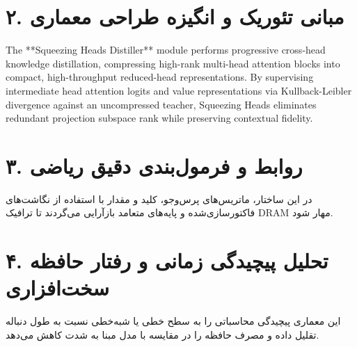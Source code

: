 \documentclass[12pt,a4paper]{article}
\begin{document}
\section*{۲. مبانی تئوریک و انگیزه طراحی معماری}
The **Squeezing Heads Distiller** module performs progressive cross-head knowledge distillation, compressing high-rank multi-head attention blocks into compact, high-throughput reduced-head representations. By supervising intermediate head attention logits and value representations via Kullback-Leibler divergence against an uncompressed teacher, Squeezing Heads eliminates redundant projection subspace rank while preserving contextual fidelity.

\section*{۳. روابط و فرمول‌بندی دقیق ریاضی}
در این ساختار، ماتریس‌های پرس‌وجو، کلید و مقدار با استفاده از نگاشت‌های فاکتورسازی‌شده و پایه‌های متعامد بازآرایی می‌گردند تا ترافیک DRAM مهار شود.

\section*{۴. تحلیل پیچیدگی زمانی و رفتار حافظه سخت‌افزاری}
این معماری پیچیدگی محاسباتی را به سطح خطی یا شبه‌خطی نسبت به طول دنباله تقلیل داده و مصرف حافظه را در مقایسه با مدل مبنا به شدت کاهش می‌دهد.
\end{document}
